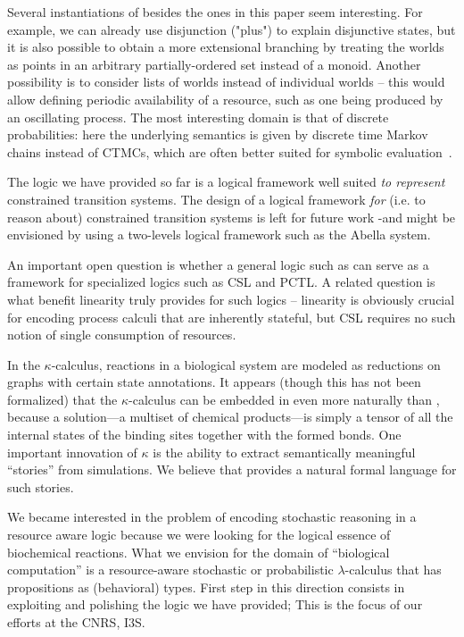 \documentclass{article}
\begin{document}
Several instantiations of \hyll besides the ones in this paper seem
interesting. For example, we can already use disjunction ("plus") to explain
disjunctive states, but it is also possible to obtain a more extensional
branching by treating the worlds as points in an arbitrary partially-ordered set
instead of a monoid. Another possibility is to consider lists of worlds instead
of individual worlds -- this would allow defining periodic availability of a
resource, such as one being produced by an oscillating process. The most
interesting domain is that of discrete probabilities: here the underlying
semantics is given by discrete time Markov chains instead of CTMCs, which are
often better suited for symbolic evaluation~\cite{wu07qest}.

The logic we have provided so far is a logical framework well suited {\it to represent}
constrained transition systems. The design of a logical framework {\it for}
(i.e. to reason about) constrained transition systems is left for future work
-and might be envisioned by using a two-levels logical framework such as the Abella system.

An important open question is whether a general logic such as \hyll can serve as
a framework for specialized logics such as CSL and PCTL. A related question is
what benefit linearity truly provides for such logics -- linearity is obviously
crucial for encoding process calculi that are inherently stateful, but CSL
requires no such notion of single consumption of resources.

In the $\kappa$-calculus, reactions in a biological system are
modeled as reductions on graphs with certain state annotations.
It appears (though this has not been formalized)
that the $\kappa$-calculus can be embedded in \hyll even more naturally than
\spi, because a solution---a multiset of chemical products---is simply a tensor
of all the internal states of the binding sites together with the formed
bonds. One important innovation of $\kappa$ is the ability to extract
semantically meaningful ``stories'' from simulations. We believe that \hyll
provides a natural formal language for such stories.

We became interested in the problem of encoding stochastic reasoning in a
resource aware logic because we were looking for the logical essence of
biochemical reactions. What we envision for the domain of ``biological
computation'' is a resource-aware stochastic or probabilistic
$\lambda$-calculus that has \hyll propositions as (behavioral) types.
First step in this direction consists in exploiting and polishing 
the logic we have provided; This is the focus of our efforts at the CNRS, I3S.
\end{document}
